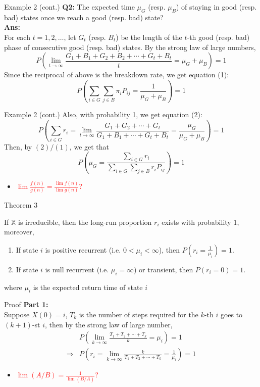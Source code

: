 \documentclass[mathserif]{beamer}
\begin{document}
\begin{frame}{Example 2 (cont.)}
	\textbf{Q2:} The expected time $\mu_G$ (resp. $\mu_B$) of staying in good (resp. bad) states once we reach a good (resp. bad) state? \\
	\textbf{Ans:} \\
	For each $t = 1, 2, \ldots$, let $G_t$ (resp. $B_t$) be the length of the $t$-th good (resp. bad) phase of consecutive good (resp. bad) states.
	By the strong law of large numbers, 
	\[
	P\left( \lim_{t\to\infty} \frac{G_1 + B_1 + G_2 + B_2 + \cdots + G_t + B_t}{t} = \mu_G + \mu_B \right) = 1
	\]
	Since the reciprocal of above is the breakdown rate, we get equation (1):
	\[
	P\left( \sum_{i \in G} \sum_{j \in B} \pi_i P_{ij} = \frac{1}{\mu_G + \mu_B} \right) = 1
	\]
\end{frame}

\begin{frame}{Example 2 (cont.)}
	Also, with probability 1, we get equation (2):
	\[
	P\left( \sum_{i \in G} r_i = 
	\lim_{t\to\infty}\frac{G_1 + G_2 + \cdots + G_t}{G_1 + B_1 + \cdots + G_t + B_t}
	= \frac{\mu_G}{\mu_G + \mu_B} \right) = 1
	\]
	Then, by $(2)/(1)$, we get that
	\[
	P\left( \mu_G = \frac{\sum_{i \in G} r_i}{\sum_{i \in G}\sum_{j \in B} r_i P_{ij}} \right) = 1
	\]
	\begin{itemize}
	\item \textcolor{red}{$\lim \frac{f(n)}{g(n)} = \frac{\lim f(n)}{\lim g(n)}$?}
	\end{itemize}
\end{frame}

\begin{frame}{Theorem 3}\label{pro_value}
	\begin{theorem}
	If $\mathbb{X}$ is irreducible, then the long-run proportion $r_i$ exists with probability $1$, moreover,
	\begin{enumerate}
	\item If state $i$ is positive recurrent (i.e. $0 < \mu_i < \infty$), then $P(r_i = \frac{1}{\mu_i}) = 1$.
	\item If state $i$ is null recurrent (i.e. $\mu_i = \infty$) or transient, then $P(r_i = 0) = 1$.
	\end{enumerate}
	where $\mu_i$ is the expected return time of state $i$
	\end{theorem}
\end{frame}

\begin{frame}{Proof}
	\textbf{Part 1:} \\
	Suppose $X(0) = i$, $T_k$ is the number of steps required for the $k$-th $i$ goes to $(k+1)$-st $i$,
	then by the strong law of large number,
	\begin{align*}
	&P\left( \lim_{k\to\infty} \frac{T_1 + T_2 + \cdots + T_k}{k} = \mu_i \right) = 1 \\
	\Rightarrow & P\left( r_i = \lim_{k\to\infty} \frac{k}{T_1 + T_2 + \cdots + T_k} = \frac{1}{\mu_i} \right) = 1
	\end{align*}
	\begin{itemize}
	\item \textcolor{red}{$\lim (A/B) = \frac{1}{\lim (B/A)}$?}
	\end{itemize}
\end{frame}
\end{document}
